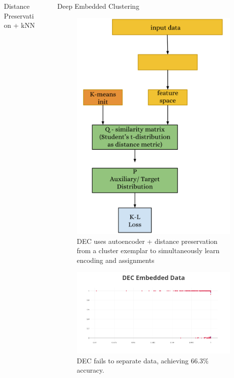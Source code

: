 \documentclass[final]{beamer}
\newlength{\sepwid}
\newlength{\onecolwid}
\begin{document}
\begin{frame}[t]
\begin{columns}[t]
\begin{column}{\onecolwid}
\begin{block}{Distance Preservation + kNN}
\end{block}





\end{column} %

\begin{column}{\sepwid}\end{column} %

\begin{column}{\onecolwid} %

\begin{block}{Deep Embedded Clustering }

\begin{figure}[!ht]
\includegraphics[angle=-90, width=0.5\linewidth]{images/architecture.png}
\caption{DEC uses autoencoder + distance preservation from a cluster exemplar to simultaneously learn encoding and assignments}
\end{figure}

\begin{figure}[!ht]
\includegraphics[width=0.8\linewidth]{images/DEC_embed.png}
\caption{DEC fails to separate data, achieving 66.3\% accuracy.}
\end{figure}


\end{block}
\end{column}
\end{columns}
\end{frame}
\end{document}
